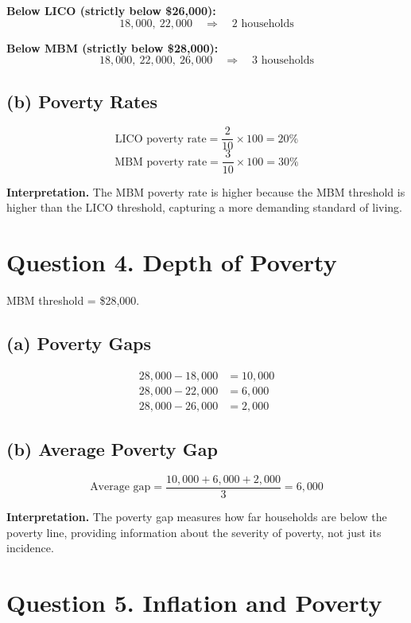\documentclass[11pt]{article}
\begin{document}
\textbf{Below LICO (strictly below \$26{,}000):}
\[
18{,}000,\ 22{,}000 \quad \Rightarrow \quad 2 \text{ households}
\]

\textbf{Below MBM (strictly below \$28{,}000):}
\[
18{,}000,\ 22{,}000,\ 26{,}000 \quad \Rightarrow \quad 3 \text{ households}
\]

\subsection*{(b) Poverty Rates}

\[
\text{LICO poverty rate}=\frac{2}{10}\times 100=20\%
\]
\[
\text{MBM poverty rate}=\frac{3}{10}\times 100=30\%
\]

\textbf{Interpretation.}  
The MBM poverty rate is higher because the MBM threshold is higher than the LICO threshold, capturing a more demanding standard of living.

\section*{Question 4. Depth of Poverty}

MBM threshold = \$28{,}000.

\subsection*{(a) Poverty Gaps}

\[
\begin{aligned}
28{,}000-18{,}000 &= 10{,}000 \\
28{,}000-22{,}000 &= 6{,}000 \\
28{,}000-26{,}000 &= 2{,}000
\end{aligned}
\]

\subsection*{(b) Average Poverty Gap}

\[
\text{Average gap}=\frac{10{,}000+6{,}000+2{,}000}{3}=6{,}000
\]

\textbf{Interpretation.}  
The poverty gap measures how far households are below the poverty line, providing information about the severity of poverty, not just its incidence.

\section*{Question 5. Inflation and Poverty}
\end{document}
